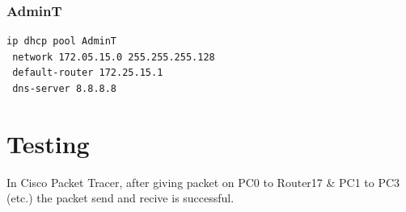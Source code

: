 \documentclass[12pt]{report}
\begin{document}
\subsection{AdminT}
\begin{lstlisting}[basicstyle=\ttfamily\small, frame=single]
ip dhcp pool AdminT
 network 172.05.15.0 255.255.255.128
 default-router 172.25.15.1
 dns-server 8.8.8.8
\end{lstlisting}
\newpage
\chapter{Testing}
In Cisco Packet Tracer, after giving packet on PC0 to Router17 \& PC1 to PC3 (etc.) the packet send and recive is successful. 
\end{document}
